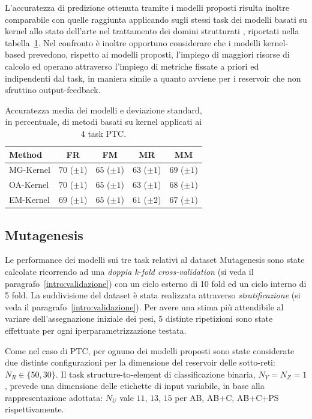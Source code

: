 L'accuratezza di predizione ottenuta tramite i modelli proposti risulta inoltre comparabile con quelle raggiunta applicando sugli stessi task dei modelli basati su kernel allo stato dell'arte nel trattamento dei domini strutturati \cite{Frohlich:OptimalAssignment}, riportati nella tabella~\ref{tab:esperimenti:kernelPTC}. Nel confronto è inoltre opportuno considerare che i modelli kernel-based prevedono, rispetto ai modelli proposti, l'impiego di maggiori risorse di calcolo ed operano attraverso l'impiego di metriche fissate a priori ed indipendenti dal task, in maniera simile a quanto avviene per i reservoir che non sfruttino output-feedback.
\begin{table}[tbp]
\small
\caption[Performance di metodi kernel-based su PTC]{Accuratezza media dei modelli e deviazione standard, in percentuale, di metodi basati su kernel applicati ai 4 task PTC.}
\label{tab:esperimenti:kernelPTC}
\centering
\begin{tabular}{l*{4}{c}}
\toprule
Method 	& FR	& FM	& MR	& MM	\\
\midrule
MG-Kernel & $70$ ($\pm 1$) & $65$ ($\pm 1$) & $63$ ($\pm 1$) & $69$ ($\pm 1$) \\
OA-Kernel & $70$ ($\pm 1$) & $65$ ($\pm 1$) & $63$ ($\pm 1$) & $68$ ($\pm 1$) \\
EM-Kernel & $69$ ($\pm 1$) & $65$ ($\pm 1$) & $61$ ($\pm 2$) & $67$ ($\pm 1$) \\
\bottomrule
\end{tabular}
\end{table}



\subsection{Mutagenesis}
Le performance dei modelli sui tre task relativi al dataset Mutagenesis sono state calcolate ricorrendo ad una \emph{doppia k-fold cross-validation} (si veda il paragrafo~\ref{intro:validazione}) con un ciclo esterno di 10 fold ed un ciclo interno di 5 fold. La suddivisione del dataset è stata realizzata attraverso \emph{stratificazione} (si veda il paragrafo~\ref{intro:validazione}).
Per avere una stima più attendibile al variare dell'assegnazione iniziale dei pesi, 5 distinte ripetizioni sono state effettuate per ogni iperparametrizzazione testata.

Come nel caso di PTC, per ognuno dei modelli proposti sono state considerate due distinte configurazioni per la dimensione del reservoir delle sotto-reti: $N_R \in \lbrace 50, 30 \rbrace$. Il task structure-to-element di classificazione binaria, $N_Y = N_Z = 1$, prevede una dimensione delle etichette di input variabile, in base alla rappresentazione adottata: $N_U$ vale $11$, $13$, $15$ per AB, AB+C, AB+C+PS rispettivamente.

